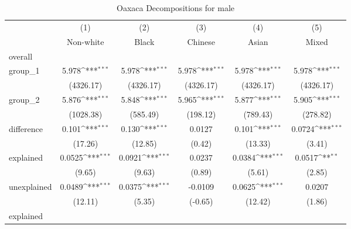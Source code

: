 \begin{table}[htbp]\centering
\def\sym#1{\ifmmode^{#1}\else\(^{#1}\)\fi}
\caption{Oaxaca Decompositions for male\label{tab1}}
\begin{tabular}{l*{5}{c}}
\hline\hline
            &\multicolumn{1}{c}{(1)}&\multicolumn{1}{c}{(2)}&\multicolumn{1}{c}{(3)}&\multicolumn{1}{c}{(4)}&\multicolumn{1}{c}{(5)}\\
            &\multicolumn{1}{c}{Non-white}&\multicolumn{1}{c}{Black}&\multicolumn{1}{c}{Chinese}&\multicolumn{1}{c}{Asian}&\multicolumn{1}{c}{Mixed}\\
\hline
overall     &                     &                     &                     &                     &                     \\
group\_1     &       5.978\sym{***}&       5.978\sym{***}&       5.978\sym{***}&       5.978\sym{***}&       5.978\sym{***}\\
            &   (4326.17)         &   (4326.17)         &   (4326.17)         &   (4326.17)         &   (4326.17)         \\
group\_2     &       5.876\sym{***}&       5.848\sym{***}&       5.965\sym{***}&       5.877\sym{***}&       5.905\sym{***}\\
            &   (1028.38)         &    (585.49)         &    (198.12)         &    (789.43)         &    (278.82)         \\
difference  &       0.101\sym{***}&       0.130\sym{***}&      0.0127         &       0.101\sym{***}&      0.0724\sym{***}\\
            &     (17.26)         &     (12.85)         &      (0.42)         &     (13.33)         &      (3.41)         \\
explained   &      0.0525\sym{***}&      0.0921\sym{***}&      0.0237         &      0.0384\sym{***}&      0.0517\sym{**} \\
            &      (9.65)         &      (9.63)         &      (0.89)         &      (5.61)         &      (2.85)         \\
unexplained &      0.0489\sym{***}&      0.0375\sym{***}&     -0.0109         &      0.0625\sym{***}&      0.0207         \\
            &     (12.11)         &      (5.35)         &     (-0.65)         &     (12.42)         &      (1.86)         \\
\hline
explained   &                     &                     &                     &                     &                     \\

\end{tabular}
\end{table}
